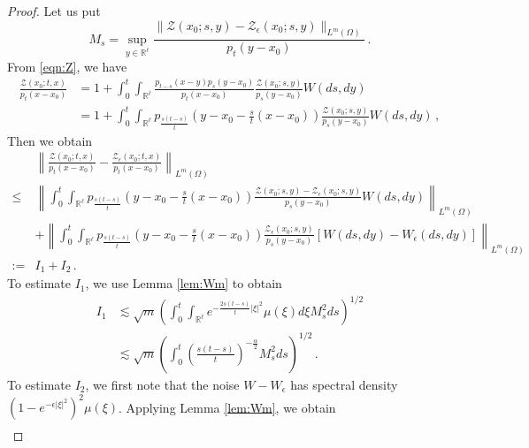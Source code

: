 \documentclass[12pt,reqno]{amsart}
\theoremstyle{remark}
\newcommand{\1}{\mathbf{1}}
\def\RR{\mathbb{R}}
\def\Z{\mathcal{Z}}
\begin{document}
	\begin{proof}%
		Let us put
		\begin{equation*}
			M_s=\sup_{y\in\RR^\ell}\frac{\|\Z(x_0;s,y)-\Z_ \epsilon(x_0;s,y)\|_{L^m(\Omega)}}{p_t(y-x_0)}\,.
		\end{equation*}
		From \eqref{eqn:Z}, we have 
		\begin{align*}
		\frac{\Z(x_0;t,x)}{p_t(x-x_0)} &= 1 + \int_0^t \int_{\RR^\ell} \frac{p_{t-s}(x-y) p_s(y-x_0)}{p_t(x-x_0)} \frac{\Z(x_0;s,y)}{p_s(y-x_0)} W(ds,dy)\\
		&= 1+ \int_0^t \int_{\RR^\ell} p_{\frac{s(t-s)}{t}} (y-x_0 - \frac{s}{t} (x-x_0)) \frac{\Z(x_0;s,y)}{p_s(y-x_0)} W(ds,dy)\,,
		\end{align*}
		Then we obtain
		\begin{align*}
		&\left\|\frac{\Z(x_0;t,x)}{p_t(x-x_0)} - \frac{\Z_{\epsilon}(x_0;t,x)}{ p_t(x-x_0)} \right\|_{L^m(\Omega)} \\
		\leq& \left\| \int_0^t \int_{\RR^\ell} p_{\frac{s(t-s)}{t}} (y-x_0-\frac{s}{t} (x-x_0)) \frac{\Z(x_0;s,y) - \Z_{\epsilon}(x_0;s,y)}{p_s(y-x_0)} W(ds,dy) \right\|_{L^m(\Omega)}\\
		&+ \left\| \int_0^t \int_{\RR^\ell} p_{\frac{s(t-s)}{t}} (y-x_0-\frac{s}{t} (x-x_0)) \frac{\Z_{\epsilon}(x_0;s,y)}{p_s(y-x_0)} \left[W(ds,dy) - W_{\epsilon}(ds,dy)\right]  \right\|_{L^m(\Omega)}\\
		:=& I_1 + I_2\,.
		\end{align*}
		To estimate $I_1$, we use Lemma \ref{lem:Wm} to obtain
		\begin{align*}
		I_1 
		& \lesssim \sqrt{m} \left( \int_0^t \int_{\RR^\ell} e^{-\frac{2s(t-s)}{t} |\xi|^2} \mu(\xi)d\xi M^2_s ds \right)^{1/2}\\
		&\lesssim \sqrt{m} \left( \int_0^t \left(\frac{s(t-s)}{t}\right)^{-\frac{\alpha}{2}} M^2_s ds \right)^{1/2}\,.
		\end{align*}
		To estimate $I_2$, we first note that the noise $W-W_ \epsilon$ has spectral density $(1- e^{-\epsilon|\xi|^2})^2\mu(\xi)$. Applying Lemma \ref{lem:Wm}, we obtain
		\begin{align*}

\end{align*}
\end{proof}
\end{document}
